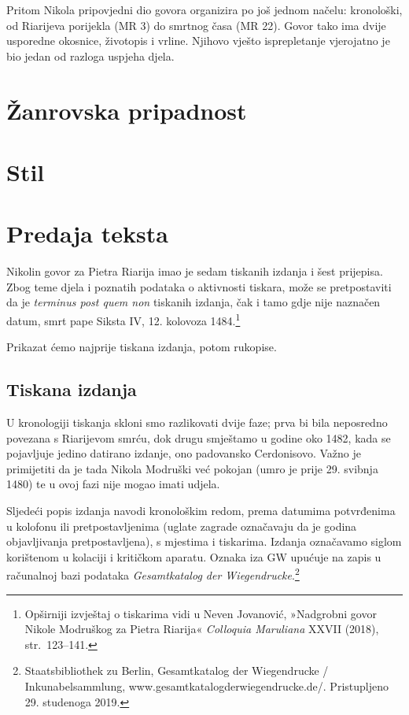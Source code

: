 \documentclass[a5paper,twoside]{article}
\begin{document}
Pritom Nikola pripovjedni dio govora organizira po još jednom načelu: kronološki, od Riarijeva porijekla (MR 3) do smrtnog časa (MR 22). Govor tako ima dvije usporedne okosnice, životopis i vrline. Njihovo vješto isprepletanje vjerojatno je bio jedan od razloga uspjeha djela.

\section{Žanrovska pripadnost}

\section{Stil}

\section{Predaja teksta}

Nikolin govor za Pietra Riarija imao je sedam tiskanih izdanja i šest prijepisa.  Zbog teme djela i poznatih podataka o aktivnosti tiskara, može se pretpostaviti da je \textit{terminus post quem non} tiskanih izdanja, čak i tamo gdje nije naznačen datum, smrt pape Siksta IV, 12. kolovoza 1484.\footnote{Opširniji izvještaj o tiskarima vidi u Neven Jovanović, »Nadgrobni govor Nikole Modruškog za Pietra Riarija« \textit{Colloquia Maruliana} XXVII (2018), str.~123–141.}

Prikazat ćemo najprije tiskana izdanja, potom rukopise.

\subsection{Tiskana izdanja}

U kronologiji tiskanja skloni smo razlikovati dvije faze; prva bi bila neposredno povezana s Riarijevom smrću, dok drugu smještamo u godine oko 1482, kada se pojavljuje jedino datirano izdanje, ono padovansko Cerdonisovo. Važno je primijetiti da je tada Nikola Modruški već pokojan (umro je prije 29. svibnja 1480) te u ovoj fazi nije mogao imati udjela.

Sljedeći popis izdanja navodi kronološkim redom, prema datumima potvrđenima u kolofonu ili pretpostavljenima (uglate zagrade označavaju da je godina objavljivanja pretpostavljena), s mjestima i tiskarima. Izdanja označavamo siglom korištenom u kolaciji i kritičkom aparatu. Oznaka iza GW upućuje na zapis u računalnoj bazi podataka \textit{Gesamtkatalog der Wiegendrucke}.\footnote{Staatsbibliothek zu Berlin, Gesamtkatalog der Wiegendrucke / Inkunabelsammlung, www.gesamtkatalogderwiegendrucke.de/. Pristupljeno 29. studenoga 2019.}
\end{document}

